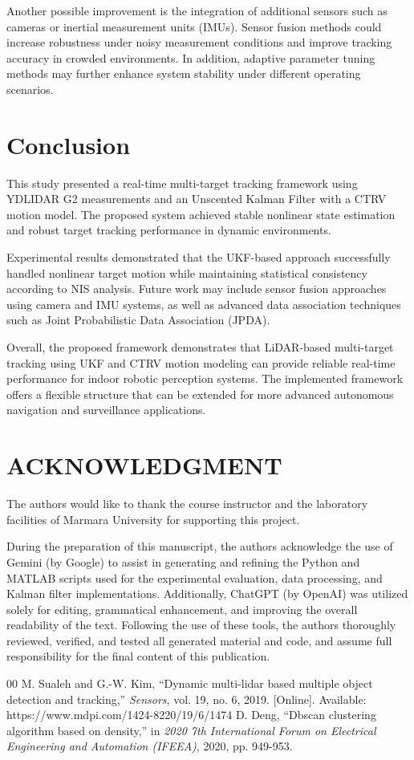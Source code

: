 \documentclass[conference]{IEEEtran}
\begin{document}
Another possible improvement is the integration of additional sensors such as cameras or inertial measurement units (IMUs). Sensor fusion methods could increase robustness under noisy measurement conditions and improve tracking accuracy in crowded environments. In addition, adaptive parameter tuning methods may further enhance system stability under different operating scenarios.

\section{Conclusion}
This study presented a real-time multi-target tracking framework using YDLIDAR G2 measurements and an Unscented Kalman Filter with a CTRV motion model. The proposed system achieved stable nonlinear state estimation and robust target tracking performance in dynamic environments.

Experimental results demonstrated that the UKF-based approach successfully handled nonlinear target motion while maintaining statistical consistency according to NIS analysis. Future work may include sensor fusion approaches using camera and IMU systems, as well as advanced data association techniques such as Joint Probabilistic Data Association (JPDA).

Overall, the proposed framework demonstrates that LiDAR-based multi-target tracking using UKF and CTRV motion modeling can provide reliable real-time performance for indoor robotic perception systems. The implemented framework offers a flexible structure that can be extended for more advanced autonomous navigation and surveillance applications.

\section*{ACKNOWLEDGMENT}
The authors would like to thank the course instructor and the laboratory facilities of Marmara University for supporting this project.

During the preparation of this manuscript, the authors acknowledge the use of Gemini (by Google) to assist in generating and refining the Python and MATLAB scripts used for the experimental evaluation, data processing, and Kalman filter implementations. Additionally, ChatGPT (by OpenAI) was utilized solely for editing, grammatical enhancement, and improving the overall readability of the text. Following the use of these tools, the authors thoroughly reviewed, verified, and tested all generated material and code, and assume full responsibility for the final content of this publication.

\begin{thebibliography}{00}
 M. Sualeh and G.-W. Kim, ``Dynamic multi-lidar based multiple object detection and tracking,'' \textit{Sensors}, vol. 19, no. 6, 2019. [Online]. Available: https://www.mdpi.com/1424-8220/19/6/1474
 D. Deng, ``Dbscan clustering algorithm based on density,'' in \textit{2020 7th International Forum on Electrical Engineering and Automation (IFEEA)}, 2020, pp. 949-953.
\end{thebibliography}
\end{document}
